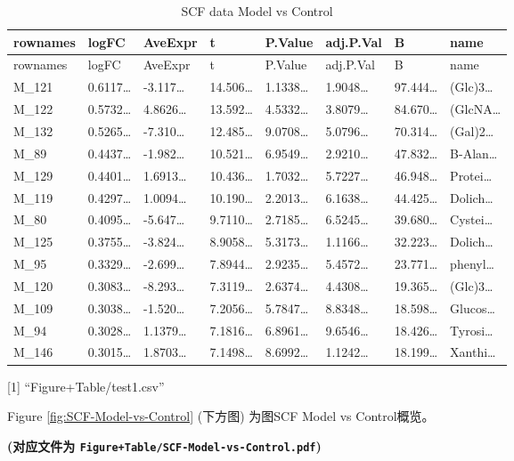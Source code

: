 \documentclass[
]{article}
\begin{document}
\begin{longtable}[]{@{}llllllll@{}}
\caption{\label{tab:SCF-data-Model-vs-Control}SCF data Model vs Control}\tabularnewline
\toprule
rownames & logFC & AveExpr & t & P.Value & adj.P.Val & B & name\tabularnewline
\midrule
\endfirsthead
\toprule
rownames & logFC & AveExpr & t & P.Value & adj.P.Val & B & name\tabularnewline
\midrule
\endhead
M\_121 & 0.6117\ldots{} & -3.117\ldots{} & 14.506\ldots{} & 1.1338\ldots{} & 1.9048\ldots{} & 97.444\ldots{} & (Glc)3\ldots{}\tabularnewline
M\_122 & 0.5732\ldots{} & 4.8626\ldots{} & 13.592\ldots{} & 4.5332\ldots{} & 3.8079\ldots{} & 84.670\ldots{} & (GlcNA\ldots{}\tabularnewline
M\_132 & 0.5265\ldots{} & -7.310\ldots{} & 12.485\ldots{} & 9.0708\ldots{} & 5.0796\ldots{} & 70.314\ldots{} & (Gal)2\ldots{}\tabularnewline
M\_89 & 0.4437\ldots{} & -1.982\ldots{} & 10.521\ldots{} & 6.9549\ldots{} & 2.9210\ldots{} & 47.832\ldots{} & B-Alan\ldots{}\tabularnewline
M\_129 & 0.4401\ldots{} & 1.6913\ldots{} & 10.436\ldots{} & 1.7032\ldots{} & 5.7227\ldots{} & 46.948\ldots{} & Protei\ldots{}\tabularnewline
M\_119 & 0.4297\ldots{} & 1.0094\ldots{} & 10.190\ldots{} & 2.2013\ldots{} & 6.1638\ldots{} & 44.425\ldots{} & Dolich\ldots{}\tabularnewline
M\_80 & 0.4095\ldots{} & -5.647\ldots{} & 9.7110\ldots{} & 2.7185\ldots{} & 6.5245\ldots{} & 39.680\ldots{} & Cystei\ldots{}\tabularnewline
M\_125 & 0.3755\ldots{} & -3.824\ldots{} & 8.9058\ldots{} & 5.3173\ldots{} & 1.1166\ldots{} & 32.223\ldots{} & Dolich\ldots{}\tabularnewline
M\_95 & 0.3329\ldots{} & -2.699\ldots{} & 7.8944\ldots{} & 2.9235\ldots{} & 5.4572\ldots{} & 23.771\ldots{} & phenyl\ldots{}\tabularnewline
M\_120 & 0.3083\ldots{} & -8.293\ldots{} & 7.3119\ldots{} & 2.6374\ldots{} & 4.4308\ldots{} & 19.365\ldots{} & (Glc)3\ldots{}\tabularnewline
M\_109 & 0.3038\ldots{} & -1.520\ldots{} & 7.2056\ldots{} & 5.7847\ldots{} & 8.8348\ldots{} & 18.598\ldots{} & Glucos\ldots{}\tabularnewline
M\_94 & 0.3028\ldots{} & 1.1379\ldots{} & 7.1816\ldots{} & 6.8961\ldots{} & 9.6546\ldots{} & 18.426\ldots{} & Tyrosi\ldots{}\tabularnewline
M\_146 & 0.3015\ldots{} & 1.8703\ldots{} & 7.1498\ldots{} & 8.6992\ldots{} & 1.1242\ldots{} & 18.199\ldots{} & Xanthi\ldots{}\tabularnewline
\bottomrule
\end{longtable}

{[}1{]} ``Figure+Table/test1.csv''

Figure \ref{fig:SCF-Model-vs-Control} (下方图) 为图SCF Model vs Control概览。

\textbf{(对应文件为 \texttt{Figure+Table/SCF-Model-vs-Control.pdf})}
\end{document}
